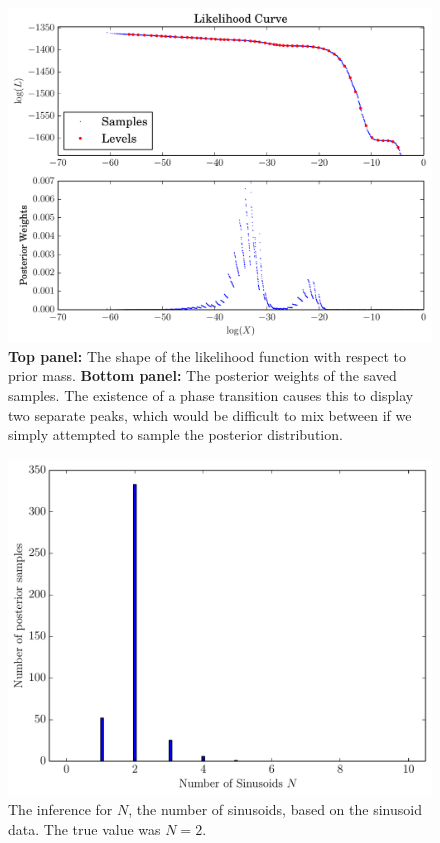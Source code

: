 \documentclass[letterpaper, 11pt]{article}
\begin{document}
\begin{figure}
\begin{center}
\includegraphics[scale=0.5]{sinewaves_likelihood.pdf}
\caption{{\bf Top panel: }
The shape of the likelihood function with respect to prior mass.
{\bf Bottom panel: }The posterior weights of the saved samples. The existence
of a phase transition causes this to display two separate peaks, which
would be difficult to mix between if we simply attempted to sample the posterior
distribution.
\label{fig:sinewaves_likelihood}}
\end{center}
\end{figure}


\begin{figure}
\begin{center}
\includegraphics[scale=0.5]{N_result.pdf}
\caption{The inference for $N$, the number of sinusoids, based on the
sinusoid data. The true value was $N=2$.
\label{fig:N_result}}
\end{center}
\end{figure}
\end{document}
